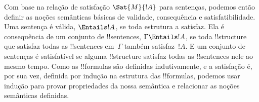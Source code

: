 \documentclass[../../../include/open-logic-section]{subfiles}
\begin{document}
Com base na relação de satisfação $\Sat{M}{!A}$ para sentenças,
podemos então definir as noções semânticas básicas de validade,
consequência e satisfatibilidade.  Uma sentença é válida, $\Entails !A$,
se toda estrutura a satisfaz. Ela é consequência de um conjunto de
!!{sentence}s, $\Gamma \Entails !A$, se toda !!{structure} que
satisfaz todas as !!{sentence}s em~$\Gamma$ também satisfaz~$!A$. E um
conjunto de sentenças é satisfatível se alguma !!{structure} satisfaz
todas as !!{sentence}s nele ao mesmo tempo.  Como as !!{formula}s são
definidas indutivamente, e a satisfação é, por sua vez, definida por
indução na estrutura das !!{formula}s, podemos usar indução para provar
propriedades da nossa semântica e relacionar as noções semânticas
definidas.
\end{document}
